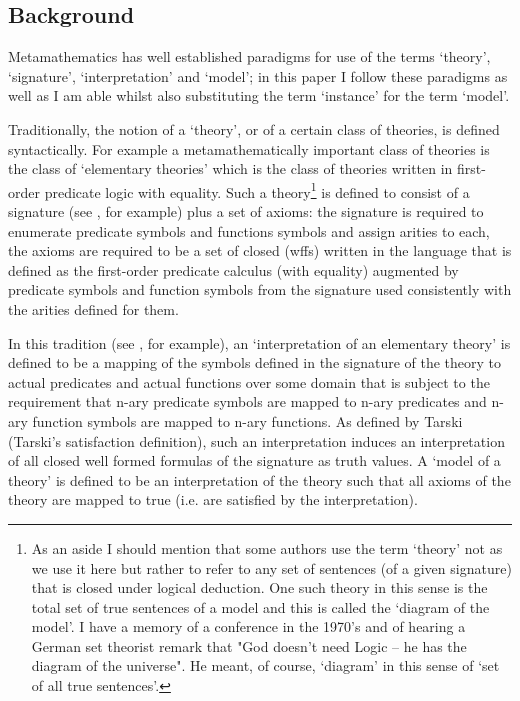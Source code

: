 \subsection{Background}
\note  Metamathematics has well established paradigms for use of the terms
`theory', `signature', `interpretation' and  `model';
in this paper I follow these paradigms
 as well as I am able whilst also substituting the term `instance' for the term `model'. 

Traditionally, the notion of a `theory', or of a certain class of theories, is  defined syntactically.
For example a metamathematically important class of theories  is the class of `elementary theories' 
which is the class of theories written in first-order predicate logic with equality. 
Such a theory\footnote {As an aside I should mention that some authors use the term `theory' not as we use it here but rather to refer to any set of sentences (of a given signature) that is closed under logical deduction. One such theory in this sense is the total set of true sentences of a model and  
this is called the `diagram of the model'. I have a  memory of a conference in the 1970's and of hearing a German set theorist
 remark that "God doesn't need Logic -- he has the diagram of the universe". He meant, of course, `diagram' in this sense of `set of all true sentences'.
} is defined to consist of a signature (see \cite{HodgesModelTheory}, for example) plus a set of axioms: 
the signature is required to enumerate predicate symbols and functions symbols and assign arities to each, 
the axioms are required  to be a set of closed  (wffs) written
in the language that is defined as the first-order predicate calculus (with equality)
 augmented by predicate symbols and function symbols from the signature  used consistently with the arities defined for them. 

\note In this tradition (see \cite{Mendelson}, for example), an `interpretation of an elementary theory' is defined to be a mapping of the symbols defined in the signature 
of the theory to actual predicates and actual functions over some domain that is subject to the requirement that n-ary predicate symbols are mapped to n-ary predicates and n-ary function symbols are mapped to n-ary functions.
As defined by Tarski (Tarski's satisfaction definition), 
such an interpretation induces an interpretation of all
closed well formed formulas of the signature as truth values. 
A `model of a theory' is defined to be an interpretation of the theory such that all axioms of the theory are mapped to true (i.e. are satisfied by the interpretation). 

